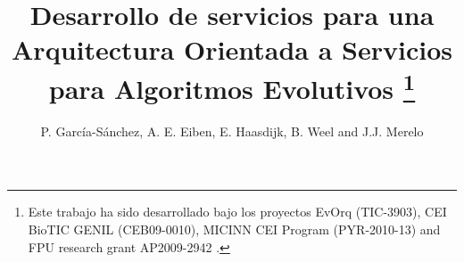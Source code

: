 \documentclass[runningheads]{llncs}
\begin{document}
\mainmatter  %



\title{Desarrollo de servicios para una Arquitectura Orientada a Servicios para Algoritmos Evolutivos \thanks{Este trabajo ha sido desarrollado bajo los proyectos EvOrq (TIC-3903), CEI BioTIC GENIL (CEB09-0010), MICINN CEI Program (PYR-2010-13) and FPU research grant AP2009-2942 .
}}


\author{P. Garc\'ia-S\'anchez, A. E. Eiben, E. Haasdijk, B. Weel and J.J. Merelo}

%







\maketitle
\end{document}
